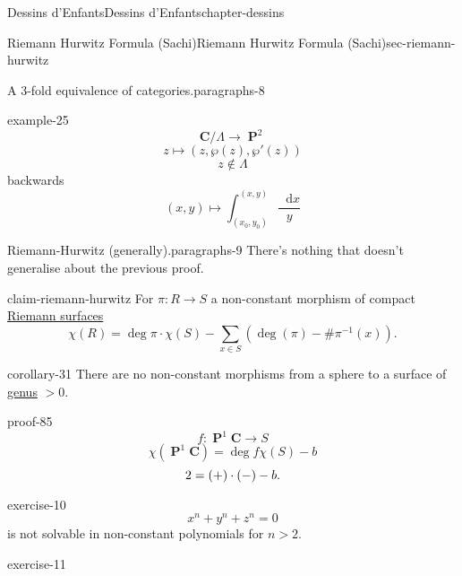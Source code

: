 \documentclass[oneside,10pt,]{book}
\renewcommand{\qedhere}{\relax}
\numberwithin{equation}{section}
\newcommand{\diff}{\mathop{}\!\mathrm{d}}
\newcommand{\inv}{^{-1}}
\newcommand{\CC}{\mathbf{C}}
\DeclareMathOperator{\PP}{\mathbf{P}}
\newcommand{\gt}{>}
\begin{document}
\begin{chapterptx}{Dessins d'Enfants}{}{Dessins d'Enfants}{}{}{chapter-dessins}
\begin{sectionptx}{Riemann Hurwitz Formula (Sachi)}{}{Riemann Hurwitz Formula (Sachi)}{}{}{sec-riemann-hurwitz}
\begin{paragraphs}{A 3-fold equivalence of categories.}{paragraphs-8}
\begin{example}{}{example-25}
\begin{equation*}
\CC/\Lambda \to \PP^2
\end{equation*}
%
\begin{equation*}
z\mapsto (z,\wp(z), \wp'(z))
\end{equation*}
%
\begin{equation*}
z\not\in \Lambda
\end{equation*}
backwards%
\begin{equation*}
(x,y) \mapsto \int_{(x_0, y_0)}^{(x,y)} \frac{\diff x}{y}
\end{equation*}
%
\end{example}
\end{paragraphs}%
\begin{paragraphs}{Riemann-Hurwitz (generally).}{paragraphs-9}%
\hypertarget{p-531}{}%
There's nothing that doesn't generalise about the previous proof.%
\begin{claim}{}{}{claim-riemann-hurwitz}%
\hypertarget{p-532}{}%
For \(\pi\colon R\to S\) a non-constant morphism of compact \hyperref[def-top-riem-surface]{Riemann surfaces}%
\begin{equation*}
\chi(R) = \deg \pi \cdot \chi(S)  - \sum_{x\in S} (\deg(\pi) - \#\pi\inv(x))\text{.}
\end{equation*}
%
\end{claim}
\begin{corollary}{}{}{corollary-31}%
\hypertarget{p-533}{}%
There are no non-constant morphisms from a sphere to a surface of \hyperref[def-class-set]{genus} \(\gt 0\).%
\end{corollary}
\begin{proofptx}{}{proof-85}
\hypertarget{p-534}{}%
%
\begin{equation*}
f\colon \PP^1 \CC \to S
\end{equation*}
%
\begin{equation*}
\chi(\PP^1 \CC) = \deg f \chi(S) - b
\end{equation*}
%
\begin{equation*}
2 = (+)\cdot (-) - b\text{.}\qedhere
\end{equation*}
%
\end{proofptx}
\begin{inlineexercise}{}{exercise-10}%
\hypertarget{p-535}{}%
%
\begin{equation*}
x^n  +y^ n + z^n = 0
\end{equation*}
is not solvable in non-constant polynomials for \(n \gt 2\).%
\end{inlineexercise}
\begin{inlineexercise}{}{exercise-11}%

\end{inlineexercise}
\end{paragraphs}
\end{sectionptx}
\end{chapterptx}
\end{document}
